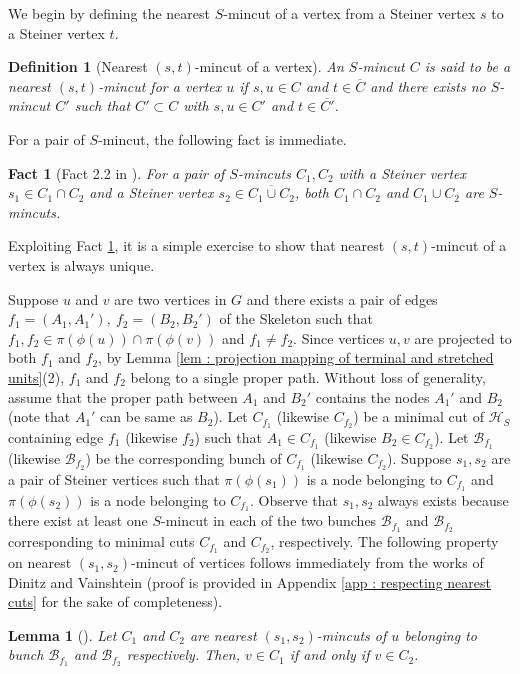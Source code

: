 \documentclass[letterpaper,11pt]{article}
\newtheorem{fact}{Fact}[]
\newtheorem{definition}{Definition}[]
\newtheorem{lemma}{Lemma}[]
\begin{document}
We begin by defining the nearest $S$-mincut of a vertex from a Steiner vertex $s$ to a Steiner vertex $t$.
\begin{definition} [Nearest $(s,t)$-mincut of a vertex] \label{def : nearest s,t mincut of a vertex}
     An $S$-mincut $C$ is said to be a nearest $(s,t)$-mincut for a vertex $u$ if $s,u\in C$ and $t\in \overline{C}$ and there exists no $S$-mincut $C'$ such that $C'\subset C$ with $s,u\in C'$ and $t\in \overline{C'}$.
\end{definition}
For a pair of $S$-mincut, the following fact is immediate.
\begin{fact}[Fact 2.2 in \cite{DBLP:journals/siamcomp/DinitzV00}] \label{fact : closed under intersection and union}
    For a pair of $S$-mincuts $C_1,C_2$ with a Steiner vertex $s_1\in C_1\cap C_2$ and a Steiner vertex $s_2\in \overline{C_1\cup C_2}$, both $C_1\cap C_2$ and $C_1\cup C_2$ are $S$-mincuts. 
\end{fact}
Exploiting Fact \ref{fact : closed under intersection and union}, it is a simple exercise to show that nearest $(s,t)$-mincut of a vertex is always unique.

Suppose $u$ and $v$ are two vertices in $G$ and there exists a pair of edges $f_1=(A_1,A_1'),~f_2=(B_2,B_2')$ of the Skeleton such that $f_1,f_2\in \pi(\phi(u)) \cap \pi(\phi(v))$ and $f_1\ne f_2$. Since vertices $u,v$ are projected to both $f_1$ and $f_2$, by Lemma \ref{lem : projection mapping of terminal and stretched units}(2), $f_1$ and $f_2$ belong to a single proper path. Without loss of generality, assume that the proper path between $A_1$ and $B_2'$ contains the nodes $A_1'$ and $B_2$ (note that $A_1'$ can be same as $B_2$). Let $C_{f_1}$ (likewise $C_{f_2}$) be a minimal cut of ${\mathcal H}_S$ containing edge $f_1$ (likewise $f_2$) such that $A_1\in C_{f_1}$ (likewise $B_2\in C_{f_2}$). Let ${\mathcal B}_{f_1}$ (likewise ${\mathcal B}_{f_2}$) be the corresponding bunch of $C_{f_1}$ (likewise $C_{f_2}$). Suppose $s_1,s_2$ are a pair of Steiner vertices such that $\pi(\phi(s_1))$ is a node belonging to $C_{f_1}$ and $\pi(\phi(s_2))$ is a node belonging to $C_{f_1}$. Observe that $s_1,s_2$ always exists because there exist at least one $S$-mincut in each of the two bunches ${\mathcal B}_{f_1}$ and ${\mathcal B}_{f_2}$ corresponding to minimal cuts $C_{f_1}$ and $C_{f_2}$, respectively. The following property on nearest $(s_1,s_2)$-mincut of vertices follows immediately from the works of Dinitz and Vainshtein \cite{DBLP:conf/stoc/DinitzV94, DBLP:conf/soda/DinitzV95, DBLP:journals/siamcomp/DinitzV00} (proof is provided in Appendix \ref{app : respecting nearest cuts} for the sake of completeness). \begin{lemma}[\cite{DBLP:conf/stoc/DinitzV94, DBLP:conf/soda/DinitzV95, DBLP:journals/siamcomp/DinitzV00}] \label{lem : respecting nearest cuts}
     Let $C_1$ and $C_2$ are nearest $(s_1,s_2)$-mincuts of $u$ belonging to bunch ${\mathcal B}_{f_1}$ and ${\mathcal B}_{f_2}$ respectively. Then, $v\in C_1$ if and only if $v\in C_2$.  
\end{lemma}
\end{document}
